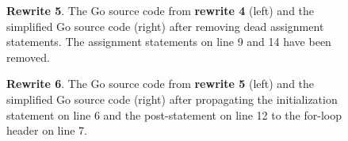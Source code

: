 \begin{figure}[htbp]
	\centering
	\begin{subfigure}[t]{0.45\textwidth}
		
	\end{subfigure}
	\qquad
	\begin{subfigure}[t]{0.45\textwidth}
		
	\end{subfigure}
	\caption{\textbf{Rewrite 5}. The Go source code from \textbf{rewrite 4} (left) and the simplified Go source code (right) after removing dead assignment statements. The assignment statements on line 9 and 14 have been removed.}
	\label{fig:rewrite_5}
\end{figure}

\begin{figure}[htbp]
	\centering
	\begin{subfigure}[t]{0.45\textwidth}
		
	\end{subfigure}
	\qquad
	\begin{subfigure}[t]{0.45\textwidth}
		
	\end{subfigure}
	\caption{\textbf{Rewrite 6}. The Go source code from \textbf{rewrite 5} (left) and the simplified Go source code (right) after propagating the initialization statement on line 6 and the post-statement on line 12 to the for-loop header on line 7.}
	\label{fig:rewrite_6}
\end{figure}
